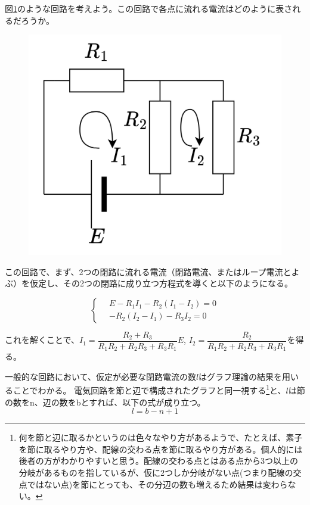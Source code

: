 \documentclass{ltjsreport}
\begin{document}
図\ref{fig:loop_analysis}のような回路を考えよう。この回路で各点に流れる電流はどのように表されるだろうか。
\begin{figure}[tbh]
  \centering
  \includegraphics[keepaspectratio, scale=0.07]
       {img/loop.drawio.png}
  \caption{}
  \label{fig:loop_analysis}
 \end{figure}


この回路で、まず、2つの閉路に流れる電流（閉路電流、またはループ電流とよぶ）を仮定し、その2つの閉路に成り立つ方程式を導くと以下のようになる。

\begin{equation}
  \left\{ \,
      \begin{aligned}
      & E - R_1I_1 - R_2(I_1-I_2) = 0  \\
      & -R_2(I_2-I_1) - R_3I_2 = 0
      \end{aligned}
  \right.
  \end{equation}

これを解くことで、$I_1 = \dfrac{R_2+R_3}{R_1R_2 + R_2R_3 + R_3R_1}E$, 
$I_2 = \dfrac{R_2}{R_1R_2 + R_2R_3 + R_3R_1}$を得る。

一般的な回路において、仮定が必要な閉路電流の数$l$はグラフ理論の結果を用いることでわかる。
電気回路を節と辺で構成されたグラフと同一視する\footnote{何を節と辺に取るかというのは色々なやり方があるようで、たとえば、素子を節に取るやり方や、配線の交わる点を節に取るやり方がある。個人的には後者の方がわかりやすいと思う。配線の交わる点とはある点から3つ以上の分岐があるものを指しているが、仮に2つしか分岐がない点(つまり配線の交点ではない点)を節にとっても、その分辺の数も増えるため結果は変わらない。}と、$l$は節の数をn、辺の数をbとすれば、以下の式が成り立つ。
\[
  l = b-n+1
\]
\end{document}
